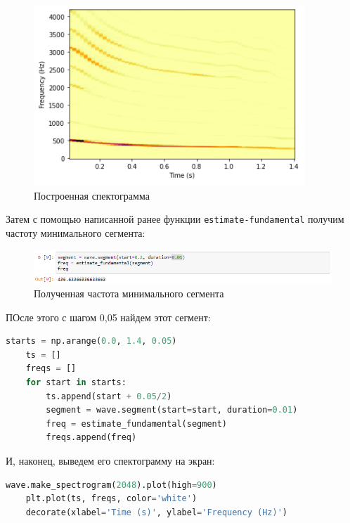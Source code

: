 \documentclass[a4paper]{article}
\begin{document}
            \begin{figure}[H]
                \centering
                \includegraphics{ex_2_spectogramma.png}
                \caption{Построенная спектограмма}
                \label{fig:ex_2_spectogramma}
            \end{figure}
            
            Затем с помощью написанной ранее функции \texttt{estimate-fundamental} получим частоту минимального сегмента:
            
            \begin{figure}[H]
                \centering
                \includegraphics[width=\textwidth]{ex_2_freq.png}
                \caption{Полученная частота минимального сегмента}
                \label{fig:ex_2_audio}
            \end{figure}
            
            ПОсле этого с шагом 0,05 найдем этот сегмент:
            
\begin{lstlisting}[language=Python, caption= Нахождение нужного сегмента]
    starts = np.arange(0.0, 1.4, 0.05)
    ts = []
    freqs = []
    for start in starts:
        ts.append(start + 0.05/2)
        segment = wave.segment(start=start, duration=0.01)
        freq = estimate_fundamental(segment)
        freqs.append(freq)
\end{lstlisting} 
            
            И, наконец, выведем его спектограмму на экран:
            
\begin{lstlisting}[language=Python, caption= Вывод спектограммы сегмента]
    wave.make_spectrogram(2048).plot(high=900)
    plt.plot(ts, freqs, color='white')
    decorate(xlabel='Time (s)', ylabel='Frequency (Hz)')
\end{lstlisting}               
            
\end{document}
